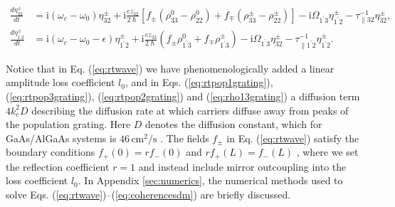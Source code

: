 \documentclass[10pt]{article}
\begin{document}
\begin{appendices}
\begin{subequations}
\begin{align}
			\frac{d\eta_{32}^{\pm}}{dt} & =\mathrm{i}\left(  \omega_{c}-\omega_{0}\right)
			\eta_{32}^{\pm}+\mathrm{i}\frac{ez_{32}}{2\hslash}\left[  f_{\pm}(\rho_{33}%
			^{0}-\rho_{22}^{0})+f_{\mp}(\rho_{33}^{\pm}-\rho_{22}^{\pm})\right]
			-\mathrm{i}\Omega_{1^{\prime}3}\eta_{1^{\prime}2}^{\pm}-\tau_{\parallel
				32}^{-1}\eta_{32}^{\pm},\\
			\frac{d\eta_{1^{\prime}2}^{\pm}}{dt} & =\mathrm{i}\left(  \omega_{c}%
			-\omega_{0}-\epsilon\right)  \eta_{1^{\prime}2}^{\pm}+\mathrm{i}\frac{ez_{32}%
			}{2\hslash}\left(  f_{\pm}\rho_{1^{\prime}3}^{0}+f_{\mp}\rho_{1^{\prime}3}^{\pm
		}\right)  -\mathrm{i}\Omega_{1^{\prime}3}\eta_{32}^{\pm}-\tau_{\parallel
		1^{\prime}2}^{-1}\eta_{1^{\prime}2}^{\pm}. \label{eq:rho12-dm}%
	\end{align}
	\end{subequations}


Notice that in Eq. (\ref{eq:rtwave}) we have phenomenologically added a linear
amplitude loss coefficient $l_{0}$, and in Eqs. (\ref{eq:rtpop1grating}),  (\ref{eq:rtpop3grating}), (\ref{eq:rtpop2grating}) and (\ref{eq:rho13grating}) a
	diffusion term $4k_{c}^{2}D$ describing the diffusion rate at which carriers
	diffuse away from peaks of the population grating. Here $D$ denotes the
	diffusion constant, which for GaAs/AlGaAs systems is ${46\,\mathrm{cm}^{2}%
	/}\mathrm{s}${ \cite{wang2009mode,vukovic2016multimode}. }
The fields $f_{\pm }$ in Eq. (\ref{eq:rtwave}) satisfy the boundary conditions
$f_{+}\left( 0\right) =rf_{-}\left( 0\right) $ and
$rf_{+}\left( L\right) =f_{-}\left( L\right) $ \cite{wang2007coherent},
where we set the reflection coefficient $r=1$ and instead include mirror outcoupling
into the loss coefficient $l_{0}$. In Appendix
\ref{sec:numerics}, the numerical methods used to solve Eqs. (\ref{eq:rtwave})--(\ref{eq:coherencesdm}) are briefly discussed.
	

\end{appendices}
\end{document}
